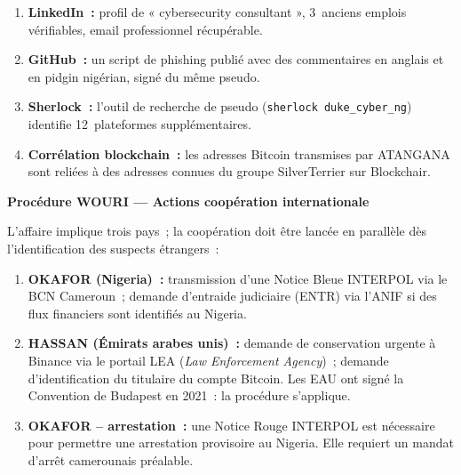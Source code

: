 \begin{enumerate}
    \item \textbf{LinkedIn~:} profil de « cybersecurity consultant »,
          3~anciens emplois vérifiables, email professionnel récupérable.
    \item \textbf{GitHub~:} un script de phishing publié avec des
          commentaires en anglais et en pidgin nigérian, signé du même
          pseudo.
    \item \textbf{Sherlock~:} l'outil de recherche de pseudo
          (\lstinline[language=bash_forensique]{sherlock duke_cyber_ng})
          identifie 12~plateformes supplémentaires.
    \item \textbf{Corrélation blockchain~:} les adresses Bitcoin
          transmises par ATANGANA sont reliées à des adresses connues du
          groupe SilverTerrier sur Blockchair.
\end{enumerate}

\begin{boxPNC}
\textbf{Procédure WOURI --- Actions coopération internationale}

L'affaire implique trois pays~; la coopération doit être lancée en parallèle
dès l'identification des suspects étrangers~:

\begin{enumerate}
    \item \textbf{OKAFOR (Nigeria)~:} transmission d'une Notice Bleue
          INTERPOL via le BCN Cameroun~; demande d'entraide judiciaire
          (ENTR) via l'ANIF si des flux financiers sont identifiés au Nigeria.

    \item \textbf{HASSAN (Émirats arabes unis)~:} demande de conservation
          urgente à Binance via le portail LEA (\textit{Law Enforcement
          Agency})~; demande d'identification du titulaire du compte Bitcoin.
          Les EAU ont signé la Convention de Budapest en 2021~: la
          procédure s'applique.

    \item \textbf{OKAFOR -- arrestation~:} une Notice Rouge INTERPOL est
          nécessaire pour permettre une arrestation provisoire au Nigeria.
          Elle requiert un mandat d'arrêt camerounais préalable.
\end{enumerate}
\end{boxPNC}

